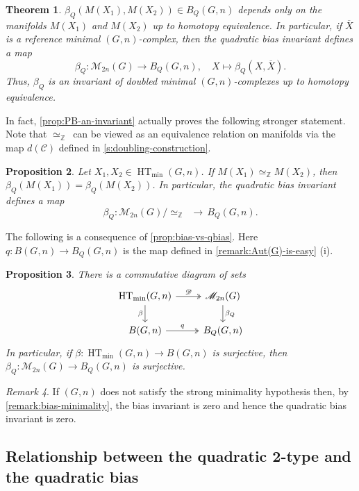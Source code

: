 \documentclass[11pt,a4paper,leqno]{amsart}
\newtheorem{theorem}{Theorem}[section]
\newtheorem{proposition}[theorem]{Proposition}
\theoremstyle{definition}
\theoremstyle{remark}
\newtheorem{remark}[theorem]{Remark}
\newcommand{\Z}{\mathbb{Z}}
\newcommand{\ol}{\overline}
\DeclareMathOperator{\HT}{HT}
\newcommand{\sM}{\mathscr{M}}
\begin{document}
\begin{theorem}\label{thm:main-high}
$\beta_Q(M(X_1),M(X_2)) \in B_Q(G,n)$ depends only on the manifolds $M(X_1)$ and $M(X_2)$ up to homotopy equivalence. In particular, if $\ol{X}$ is a reference minimal $(G,n)$-complex, then the quadratic bias invariant defines a map
\[ \beta_Q\colon \sM_{2n}(G) \to B_Q(G,n), \quad X \mapsto \beta_Q(X,\ol{X}). \]
Thus, $\beta_Q$ is an invariant of doubled minimal $(G,n)$-complexes up to homotopy equivalence.
\end{theorem}

In fact, \cref{prop:PB-an-invariant} actually proves the following stronger statement. 
Note that $\simeq_{\Z}\,$ can be viewed as an equivalence relation on manifolds via the map $d(\mathscr{C})$ defined in \cref{s:doubling-construction}.

\begin{proposition}
Let $X_1, X_2 \in \HT_{\min}(G,n)$. If $M(X_1) \simeq_{\Z} M(X_2)$, then $\beta_Q(M(X_1)) = \beta_Q(M(X_2))$. In particular, the quadratic bias invariant defines a map
\[ \beta_Q\colon\sM_{2n}(G)/\simeq_{\Z} \,\,\, \to \, B_Q(G,n). \]
\end{proposition}
The following is a consequence of \cref{prop:bias-vs-qbias}. 
Here $q\colon B(G,n) \to B_Q(G,n)$ is the map defined in \cref{remark:Aut(G)-is-easy} (i).

\begin{proposition}\label{prop:beta-to-betaQ}
There is a commutative diagram of sets
\[
\begin{tikzcd}
\HT_{\min}(G,n)
\ar[r,twoheadrightarrow,"\mathscr{D}"] \ar[d,"\text{$\beta$}"'] & \sM_{2n}(G)
 \ar[d,"\text{$\beta_Q$}"] \\
\displaystyle B(G,n) \ar[r,twoheadrightarrow,"q"] & \displaystyle B_Q(G,n)
\end{tikzcd}
\]
In particular, if $\beta\colon  \HT_{\min}(G,n) \to B(G,n)$ is surjective, then $\beta_Q\colon  \sM_{2n}(G) \to B_Q(G,n)$ is surjective. 
\end{proposition}

\begin{remark}
If $(G,n)$ does not satisfy the strong minimality hypothesis then, by \cref{remark:bias-minimality}, the bias invariant is zero and hence the quadratic bias invariant is zero.
\end{remark}

\subsection{Relationship between the quadratic 2-type and the quadratic bias} \label{ss:Q2type}
\end{document}

